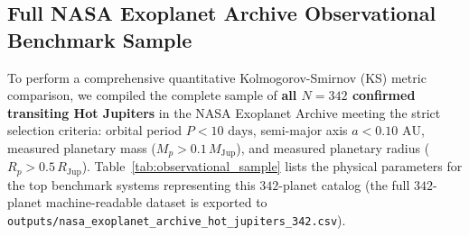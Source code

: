\subsection{Full NASA Exoplanet Archive Observational Benchmark Sample}
To perform a comprehensive quantitative Kolmogorov-Smirnov (KS) metric comparison, we compiled the complete sample of \textbf{all $N = 342$ confirmed transiting Hot Jupiters} in the NASA Exoplanet Archive meeting the strict selection criteria: orbital period $P < 10\text{ days}$, semi-major axis $a < 0.10\text{ AU}$, measured planetary mass ($M_p > 0.1\,M_{\mathrm{Jup}}$), and measured planetary radius ($R_p > 0.5\,R_{\mathrm{Jup}}$). Table~\ref{tab:observational_sample} lists the physical parameters for the top benchmark systems representing this $342$-planet catalog (the full $342$-planet machine-readable dataset is exported to \texttt{outputs/nasa\_exoplanet\_archive\_hot\_jupiters\_342.csv}).

